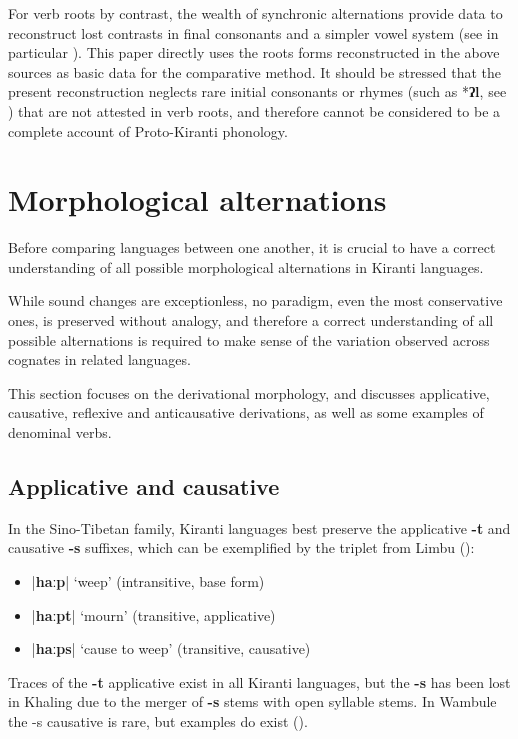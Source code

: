 \documentclass[oneside,a4paper,11pt]{article}
\newcommand{\ipa}[1]{\textbf{{\phon\mbox{#1}}}} %
\newcommand{\dhatu}[2]{|\ipa{#1}| `#2'}
\begin{document}
For verb roots by contrast, the wealth of synchronic alternations provide data to reconstruct lost contrasts in final consonants and a simpler vowel system (see in particular \citealt{michailovsky02dico, jacques12khaling, michailovsky12dumi}). This paper directly uses the roots forms reconstructed in the above sources as basic data for the comparative method. It should be stressed that the present reconstruction neglects rare initial consonants or rhymes (such as *\ipa{ʔl}, see \citealt{opgenort04implosives}) that are not attested in verb roots, and therefore cannot be considered to be a complete account of Proto-Kiranti phonology.


\section{Morphological alternations} \label{sec:alternations}
Before comparing languages between one another, it is crucial to have a correct understanding of all possible morphological alternations in Kiranti languages. 

While sound changes are exceptionless, no paradigm, even the most conservative ones, is preserved without analogy, and therefore a correct understanding of all possible alternations is required to make sense of the variation observed across cognates in related languages.

This section focuses on the derivational morphology, and discusses applicative, causative, reflexive and anticausative derivations,  as well as some examples of denominal verbs.

\subsection{Applicative and causative} \label{sec:appl}
In the Sino-Tibetan family, Kiranti languages best preserve the applicative \ipa{-t} and causative \ipa{-s} suffixes, which can be exemplified by the triplet from Limbu (\citealt{michailovsky85dental}):

\begin{itemize}
\item  \dhatu{haːp}{weep} (intransitive, base form)
\item  \dhatu{haːpt}{mourn} (transitive, applicative)
\item  \dhatu{haːps}{cause to weep} (transitive, causative)
\end{itemize}

Traces of the \ipa{-t} applicative exist in all Kiranti languages, but the \ipa{-s} has been lost in Khaling due to the merger of \ipa{-s} stems with open syllable stems.  In Wambule the -s causative is rare, but examples do exist (\citealt[270-1]{opgenort04wambule}).
\end{document}
